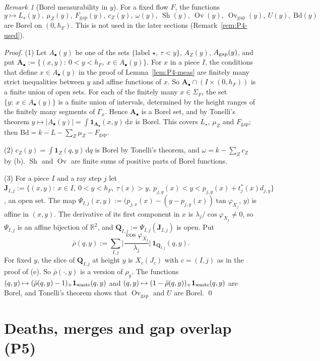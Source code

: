 \documentclass[11pt]{amsart}
\newcommand{\R}{\mathbb R}
\newcommand{\Sh}{\operatorname{Sh}}
\newcommand{\Ov}{\operatorname{Ov}}
\newcommand{\Ovgap}{\operatorname{Ov}_{\mathrm{gap}}}
\newcommand{\Fgap}{F_{\mathrm{gap}}}
\newcommand{\dd}{\,\mathrm d}
\theoremstyle{definition}
\theoremstyle{remark}
\newtheorem{remark}[theorem]{Remark}
\numberwithin{equation}{section}
\begin{document}
\begin{remark}[Borel measurability in $y$]\label{rem:P4-borel}
For a fixed flow $F$, the functions
\[
y\mapsto L_\star(y),\ \mu_Z(y),\ \Fgap(y),\ c_Z(y),\ \omega(y),\ \Sh(y),\ \Ov(y),\ \Ovgap(y),\ U(y),\ \mathrm{Bd}(y)
\]
are Borel on $(0,h_F)$. This is not used in the later sections (Remark~\ref{rem:P4-used}).

\emph{Proof.} (1) Let $A_\bullet(y)$ be one of the sets $\{\text{label }\star,\ \tau<y\}$, $A_Z(y)$, $A_{\rm gap}(y)$, and put $\mathbf A_\bullet:=\{(x,y):\ 0<y<h_F,\ x\in A_\bullet(y)\}$. For $x$ in a piece $I$, the conditions that define $x\in A_\bullet(y)$ in the proof of Lemma~\ref{lem:P4-meas} are finitely many strict inequalities between $y$ and affine functions of $x$. So $\mathbf A_\bullet\cap(I\times(0,h_F))$ is a finite union of open sets. For each of the finitely many $x\in\Sigma_F$, the set $\{y:\ x\in A_\bullet(y)\}$ is a finite union of intervals, determined by the height ranges of the finitely many segments of $\Gamma_x$. Hence $\mathbf A_\bullet$ is a Borel set, and by Tonelli's theorem $y\mapsto|A_\bullet(y)|=\int\mathbf 1_{\mathbf A_\bullet}(x,y)\dd x$ is Borel. This covers $L_\star$, $\mu_Z$ and $\Fgap$; then $\mathrm{Bd}=k-L-\sum_Z\mu_Z-\Fgap$.

(2) $c_Z(y)=\int\mathbf 1_Z(q,y)\dd q$ is Borel by Tonelli's theorem, and $\omega=k-\sum_Zc_Z$ by (b). $\Sh$ and $\Ov$ are finite sums of positive parts of Borel functions.

(3) For a piece $I$ and a ray step $j$ let $\mathbf J_{I,j}:=\{(x,y):\ x\in I,\ 0<y<h_F,\ \tau(x)>y,\ p_{j,y}(x)<y<p_{j,y}(x)+t^*_j(x)d_{j,y}\}$, an open set. The map $\Psi_{I,j}(x,y):=\big(p_{j,x}(x)-(y-p_{j,y}(x))\tan\varphi_{X_j},\,y\big)$ is affine in $(x,y)$. The derivative of its first component in $x$ is $\lambda_j/\cos\varphi_{X_j}\ne0$, so $\Psi_{I,j}$ is an affine bijection of $\R^2$, and $\mathbf Q_{I,j}:=\Psi_{I,j}(\mathbf J_{I,j})$ is open. Put
\[
\bar\rho(q,y):=\sum_{I,j}\Big|\frac{\cos\varphi_{X_j}}{\lambda_j}\Big|\,\mathbf 1_{\mathbf Q_{I,j}}(q,y).
\]
For fixed $y$, the slice of $\mathbf Q_{I,j}$ at height $y$ is $X_c(J_c)$ with $c=(I,j)$ as in the proof of (e). So $\bar\rho(\cdot,y)$ is a version of $\rho_y$. The functions $(q,y)\mapsto(\bar\rho(q,y)-1)_+\mathbf 1_{\rm waste}(q,y)$ and $(q,y)\mapsto(1-\bar\rho(q,y))_+\mathbf 1_{\rm waste}(q,y)$ are Borel, and Tonelli's theorem shows that $\Ovgap$ and $U$ are Borel. \qed
\end{remark}

\section{Deaths, merges and gap overlap (P5)}\label{sec:P5}
\end{document}
